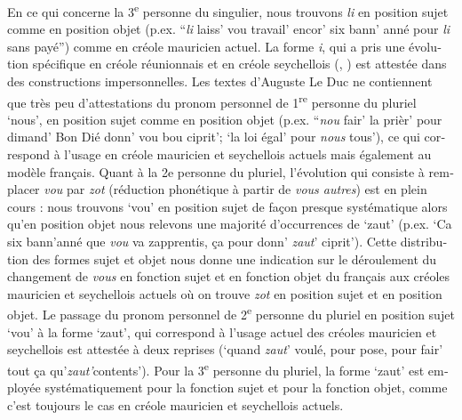 \documentclass[output=paper]{langscibook}
\begin{document}
\begin{otherlanguage}{french}
En ce qui concerne la 3\textsuperscript{e} personne du singulier, nous trouvons \textit{li} en position sujet comme en position objet (p.ex. “\textit{li} laiss’ vou travail’ encor’ six bann’ anné pour \textit{li} sans payé”) comme en créole mauricien actuel. La forme \textit{i}, qui a pris une évolution spécifique en créole réunionnais et en créole seychellois (\citealt{Michaelis2000}, \citealt{Watbled2016}) est attestée dans des constructions impersonnelles. Les textes d’Auguste Le Duc ne contiennent que très peu d’attestations du pronom personnel de 1\textsuperscript{re} personne du pluriel ‘nous’, en position sujet comme en position objet (p.ex. “\textit{nou} fair’ la prièr’ pour dimand’ Bon Dié donn’ vou bou ciprit’; ‘la loi égal’ pour \textit{nous} tous’), ce qui correspond à l’usage en créole mauricien et seychellois actuels mais également au modèle français. Quant à la 2e personne du pluriel, l’évolution qui consiste à remplacer \textit{vou} par \textit{zot} (réduction phonétique à partir de \textit{vous autres}) est en plein cours : nous trouvons ‘vou’ en position sujet de façon presque systématique alors qu’en position objet nous relevons une majorité d’occurrences de ‘zaut’ (p.ex. ‘Ca six bann’anné que \textit{vou} va zapprentis, ça pour donn’ \textit{zaut}’ ciprit’). Cette distribution des formes sujet et objet nous donne une indication sur le déroulement du changement de \textit{vous} en fonction sujet et en fonction objet du français aux créoles mauricien et seychellois actuels où on trouve \textit{zot} en position sujet et en position objet. Le passage du pronom personnel de 2\textsuperscript{e} personne du pluriel en position sujet ‘vou’ à la forme ‘zaut’, qui correspond à l’usage actuel des créoles mauricien et seychellois est attestée à deux reprises (‘quand \textit{zaut}’ voulé, pour pose, pour fair’ tout ça qu’\textit{zaut’}contents’). Pour la 3\textsuperscript{e} personne du pluriel, la forme ‘zaut’ est employée systématiquement pour la fonction sujet et pour la fonction objet, comme c’est toujours le cas en créole mauricien et seychellois actuels. 

\end{otherlanguage}
\end{document}
